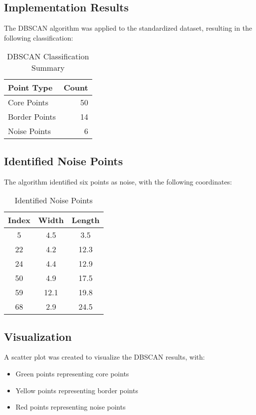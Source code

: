 \documentclass[12pt]{article}
\begin{document}
\subsection{Implementation Results}
The DBSCAN algorithm was applied to the standardized dataset, resulting in the following classification:

\begin{table}[H]
\centering
\begin{tabular}{lr}
\toprule
Point Type & Count \\
\midrule
Core Points & 50 \\
Border Points & 14 \\
Noise Points & 6 \\
\bottomrule
\end{tabular}
\caption{DBSCAN Classification Summary}
\end{table}

\subsection{Identified Noise Points}
The algorithm identified six points as noise, with the following coordinates:
\begin{table}[H]
\centering
\begin{tabular}{ccc}
\toprule
Index & Width & Length \\
\midrule
5 & 4.5 & 3.5 \\
22 & 4.2 & 12.3 \\
24 & 4.4 & 12.9 \\
50 & 4.9 & 17.5 \\
59 & 12.1 & 19.8 \\
68 & 2.9 & 24.5 \\
\bottomrule
\end{tabular}
\caption{Identified Noise Points}
\end{table}

\subsection{Visualization}
A scatter plot was created to visualize the DBSCAN results, with:
\begin{itemize}
    \item Green points representing core points
    \item Yellow points representing border points
    \item Red points representing noise points
\end{itemize}
\end{document}
